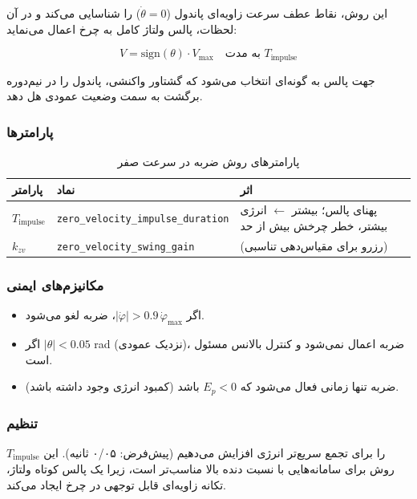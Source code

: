 این روش، نقاط عطف سرعت زاویه‌ای پاندول ($\dot\theta = 0$) را شناسایی می‌کند و در آن لحظات، پالس ولتاژ کامل به چرخ اعمال می‌نماید:

\begin{equation}
V = \text{sign}(\theta) \cdot V_{\max} \quad \text{به مدت } T_{\text{impulse}}
\end{equation}

جهت پالس به گونه‌ای انتخاب می‌شود که گشتاور واکنشی، پاندول را در نیم‌دوره برگشت به سمت وضعیت عمودی هل دهد.

\subsubsection{پارامترها}

\begin{table}[H]
\centering
\caption{پارامترهای روش ضربه در سرعت صفر}
\label{tab:zv-params}
\begin{tabular}{@{}lll@{}}
\toprule
پارامتر & نماد & اثر \\
\midrule
$T_{\text{impulse}}$ & \texttt{zero\_velocity\_impulse\_duration} & پهنای پالس؛ بیشتر $\leftarrow$ انرژی بیشتر، خطر چرخش بیش از حد \\
$k_{zv}$ & \texttt{zero\_velocity\_swing\_gain} & (رزرو برای مقیاس‌دهی تناسبی) \\
\bottomrule
\end{tabular}
\end{table}

\subsubsection{مکانیزم‌های ایمنی}

\begin{itemize}
    \item اگر $|\dot\varphi| > 0.9\,\dot\varphi_{\max}$، ضربه لغو می‌شود.
    \item اگر $|\theta| < 0.05$ rad (نزدیک عمودی)، ضربه اعمال نمی‌شود و کنترل بالانس مسئول است.
    \item ضربه تنها زمانی فعال می‌شود که $E_p < 0$ باشد (کمبود انرژی وجود داشته باشد).
\end{itemize}

\subsubsection{تنظیم}

$T_{\text{impulse}}$ را برای تجمع سریع‌تر انرژی افزایش می‌دهیم (پیش‌فرض: ۰/۰۵ ثانیه). این روش برای سامانه‌هایی با نسبت دنده بالا مناسب‌تر است، زیرا یک پالس کوتاه ولتاژ، تکانه زاویه‌ای قابل توجهی در چرخ ایجاد می‌کند.


